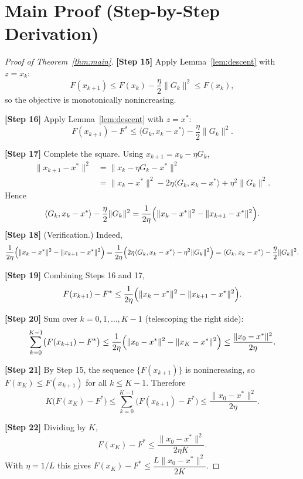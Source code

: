 \documentclass[11pt]{article}
\begin{document}
\section*{Main Proof (Step-by-Step Derivation)}

\begin{proof}[Proof of Theorem~\ref{thm:main}]
\textbf{[Step 15]} Apply Lemma~\ref{lem:descent} with $z = x_k$:
\[
F(x_{k+1}) \le F(x_k) - \frac{\eta}{2}\|G_k\|^2 \le F(x_k),
\]
so the objective is monotonically nonincreasing.

\textbf{[Step 16]} Apply Lemma~\ref{lem:descent} with $z = x^\ast$:
\[
F(x_{k+1}) - F^\ast \le \langle G_k, x_k - x^\ast\rangle - \frac{\eta}{2}\|G_k\|^2.
\]

\textbf{[Step 17]} Complete the square. Using $x_{k+1} = x_k - \eta G_k$,
\begin{align*}
\|x_{k+1}-x^\ast\|^2 &= \|x_k - \eta G_k - x^\ast\|^2\\
&= \|x_k - x^\ast\|^2 - 2\eta\langle G_k, x_k - x^\ast\rangle + \eta^2\|G_k\|^2.
\end{align*}
Hence
\[
\langle G_k, x_k-x^\ast\rangle - \frac{\eta}{2}\|G_k\|^2
= \frac{1}{2\eta}\Bigl(\|x_k - x^\ast\|^2 - \|x_{k+1}-x^\ast\|^2\Bigr).
\]
\textbf{[Step 18]} (Verification.) Indeed,
\[
\frac{1}{2\eta}\Bigl(\|x_k-x^\ast\|^2 - \|x_{k+1}-x^\ast\|^2\Bigr)
= \frac{1}{2\eta}\Bigl(2\eta\langle G_k, x_k-x^\ast\rangle - \eta^2\|G_k\|^2\Bigr)
= \langle G_k, x_k-x^\ast\rangle - \frac{\eta}{2}\|G_k\|^2.
\]

\textbf{[Step 19]} Combining Steps 16 and 17,
\[
F(x_{k+1}) - F^\ast \le \frac{1}{2\eta}\Bigl(\|x_k - x^\ast\|^2 - \|x_{k+1}-x^\ast\|^2\Bigr).
\]

\textbf{[Step 20]} Sum over $k = 0,1,\dots,K-1$ (telescoping the right side):
\[
\sum_{k=0}^{K-1}\bigl(F(x_{k+1}) - F^\ast\bigr)
\le \frac{1}{2\eta}\Bigl(\|x_0 - x^\ast\|^2 - \|x_K - x^\ast\|^2\Bigr)
\le \frac{\|x_0 - x^\ast\|^2}{2\eta}.
\]

\textbf{[Step 21]} By Step 15, the sequence $\{F(x_{k+1})\}$ is nonincreasing, so $F(x_K) \le F(x_{k+1})$ for all $k \le K-1$. Therefore
\[
K\bigl(F(x_K) - F^\ast\bigr) \le \sum_{k=0}^{K-1}\bigl(F(x_{k+1}) - F^\ast\bigr) \le \frac{\|x_0 - x^\ast\|^2}{2\eta}.
\]

\textbf{[Step 22]} Dividing by $K$,
\[
F(x_K) - F^\ast \le \frac{\|x_0 - x^\ast\|^2}{2\eta K}.
\]
With $\eta = 1/L$ this gives $F(x_K)-F^\ast \le \dfrac{L\|x_0-x^\ast\|^2}{2K}$. \qedhere
\end{proof}
\end{document}
